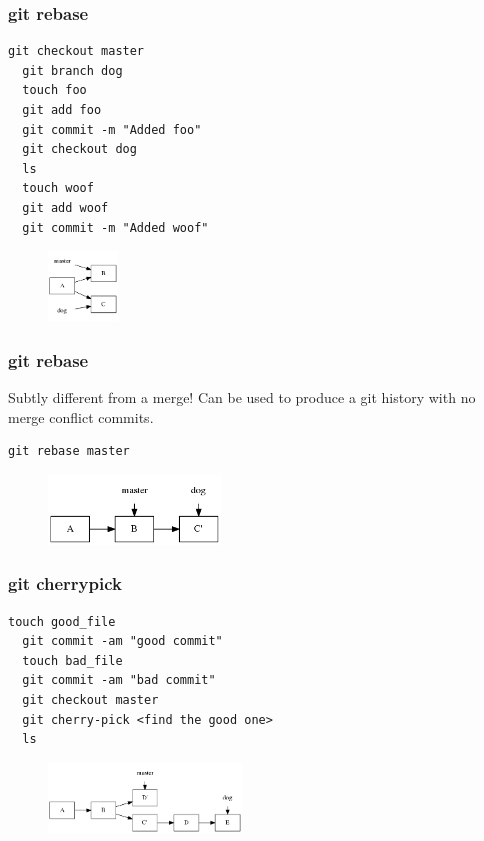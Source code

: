 \documentclass{beamer}
\begin{document}
\begin{frame}[fragile]
\frametitle{git rebase}

\begin{lstlisting}[frame=single]
  git checkout master
  git branch dog
  touch foo
  git add foo
  git commit -m "Added foo"
  git checkout dog
  ls
  touch woof
  git add woof
  git commit -m "Added woof"
\end{lstlisting}

\begin{figure}[p]
  \centering
  \includegraphics[height=5em]{dog.png}
\end{figure}

\end{frame}

\begin{frame}[fragile]
\frametitle{git rebase}

Subtly different from a merge! Can be used to produce a git history with no merge conflict commits.

\vspace{1em}

\begin{lstlisting}[frame=single]
  git rebase master
\end{lstlisting}

\begin{figure}[p]
  \centering
  \includegraphics[height=5em]{rebase.png}
\end{figure}

\end{frame}

\begin{frame}[fragile]
\frametitle{git cherrypick}
  
\vspace{1em}

\begin{lstlisting}[frame=single]
  touch good_file
  git commit -am "good commit"
  touch bad_file
  git commit -am "bad commit"
  git checkout master
  git cherry-pick <find the good one>
  ls
\end{lstlisting}

\begin{figure}[p]
  \centering
  \includegraphics[height=5em]{cherry.png}
\end{figure}

\end{frame}
\end{document}
